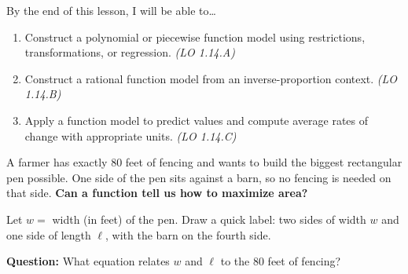 \documentclass[10pt]{article}
\begin{document}
\namedateperiod

\vspace{0.08in}

\begin{objectivebox}
By the end of this lesson, I will be able to\ldots
\begin{enumerate}[itemsep=2pt]
  \item Construct a polynomial or piecewise function model using restrictions, transformations,
        or regression. \hfill\textit{(LO 1.14.A)}
  \item Construct a rational function model from an inverse-proportion context. \hfill\textit{(LO 1.14.B)}
  \item Apply a function model to predict values and compute average rates of change
        with appropriate units. \hfill\textit{(LO 1.14.C)}
\end{enumerate}
\end{objectivebox}

\vspace{0.06in}

\begin{vocabbox}
\end{vocabbox}

\vspace{0.06in}

\begin{hookbox}
A farmer has exactly 80 feet of fencing and wants to build the biggest rectangular pen possible.
One side of the pen sits against a barn, so no fencing is needed on that side.
\textbf{Can a function tell us how to maximize area?}

\medskip
Let $w = $ width (in feet) of the pen. Draw a quick label: two sides of width $w$ and one side
of length $\ell$, with the barn on the fourth side.

\medskip
\textbf{Question:} What equation relates $w$ and $\ell$ to the 80 feet of fencing?

\vspace{0.06in}
\writeline
\end{hookbox}

\vspace{0.06in}
\end{document}
